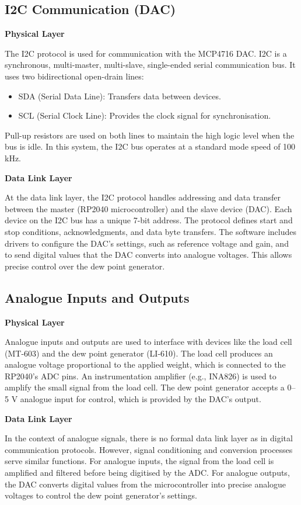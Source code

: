 \subsection{I2C Communication (DAC)}
\textbf{Physical Layer}

The I2C protocol is used for communication with the MCP4716 DAC. I2C is a synchronous, multi-master, multi-slave, single-ended serial communication bus. It uses two bidirectional open-drain lines:
\begin{itemize}
    \item SDA (Serial Data Line): Transfers data between devices.
    \item SCL (Serial Clock Line): Provides the clock signal for synchronisation.
\end{itemize}
Pull-up resistors are used on both lines to maintain the high logic level when the bus is idle. In this system, the I2C bus operates at a standard mode speed of 100 kHz.

\textbf{Data Link Layer}

At the data link layer, the I2C protocol handles addressing and data transfer between the master (RP2040 microcontroller) and the slave device (DAC). Each device on the I2C bus has a unique 7-bit address. The protocol defines start and stop conditions, acknowledgments, and data byte transfers. The software includes drivers to configure the DAC's settings, such as reference voltage and gain, and to send digital values that the DAC converts into analogue voltages. This allows precise control over the dew point generator.

\subsection{Analogue Inputs and Outputs}
\textbf{Physical Layer}

Analogue inputs and outputs are used to interface with devices like the load cell (MT-603) and the dew point generator (LI-610). The load cell produces an analogue voltage proportional to the applied weight, which is connected to the RP2040's ADC pins. An instrumentation amplifier (e.g., INA826) is used to amplify the small signal from the load cell. The dew point generator accepts a 0–5 V analogue input for control, which is provided by the DAC's output.

\textbf{Data Link Layer}

In the context of analogue signals, there is no formal data link layer as in digital communication protocols. However, signal conditioning and conversion processes serve similar functions. For analogue inputs, the signal from the load cell is amplified and filtered before being digitised by the ADC. For analogue outputs, the DAC converts digital values from the microcontroller into precise analogue voltages to control the dew point generator's settings.

